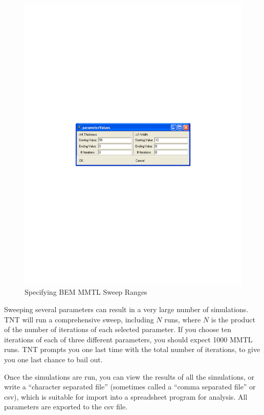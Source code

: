 \documentclass{article}
\begin{document}
\begin{figure}[hbt]
\begin{center}\includegraphics[scale=0.5]{sweep-parameters}\end{center}
\caption { Specifying BEM MMTL Sweep Ranges}
\label{fig:sweep-parameters}
\end{figure}

Sweeping several parameters can result in a very large number of
simulations.  TNT will run a comprehensive sweep, including $N$ runs,
where $N$ is the product of the number of iterations of each selected
parameter.  If you choose ten iterations of each of three different
parameters, you should expect 1000 MMTL runs.  TNT prompts you one
last time with the total number of iterations, to give you one last
chance to bail out.

Once the simulations are run, you can view the results of all the
simulations, or write a ``character separated file'' (sometimes called
a ``comma separated file'' or csv), which is suitable for import into
a spreadsheet program for analysis.  All parameters are exported to
the csv file.
\end{document}
